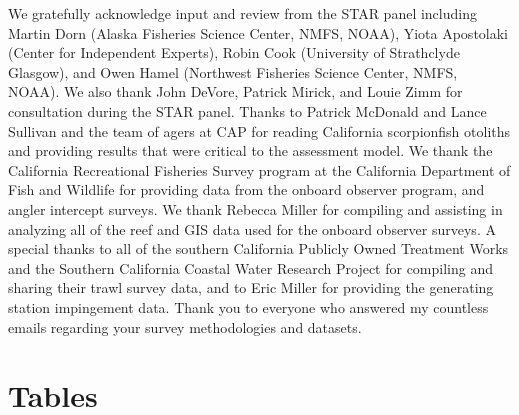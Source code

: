 \documentclass[12pt,]{article}
\begin{document}
We gratefully acknowledge input and review from the STAR panel including
Martin Dorn (Alaska Fisheries Science Center, NMFS, NOAA), Yiota
Apostolaki (Center for Independent Experts), Robin Cook (University of
Strathclyde Glasgow), and Owen Hamel (Northwest Fisheries Science
Center, NMFS, NOAA). We also thank John DeVore, Patrick Mirick, and
Louie Zimm for consultation during the STAR panel. Thanks to Patrick
McDonald and Lance Sullivan and the team of agers at CAP for reading
California scorpionfish otoliths and providing results that were
critical to the assessment model. We thank the California Recreational
Fisheries Survey program at the California Department of Fish and
Wildlife for providing data from the onboard observer program, and
angler intercept surveys. We thank Rebecca Miller for compiling and
assisting in analyzing all of the reef and GIS data used for the onboard
observer surveys. A special thanks to all of the southern California
Publicly Owned Treatment Works and the Southern California Coastal Water
Research Project for compiling and sharing their trawl survey data, and
to Eric Miller for providing the generating station impingement data.
Thank you to everyone who answered my countless emails regarding your
survey methodologies and datasets.

\newpage

\FloatBarrier

\section{Tables}\label{tables}

\FloatBarrier
\end{document}

